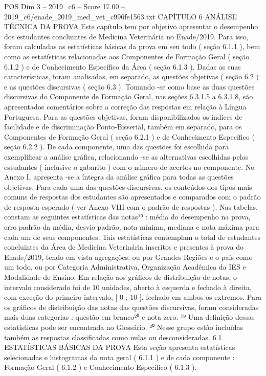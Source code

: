 \begin{textsample}{POS Dim 3 – 2019\_c6 – Score 17.00 – 2019\_c6/enade\_2019\_med\_vet\_c996fe1563.txt}  \label{ex:f3_pos_010}
CAPÍTULO 6 ANÁLISE TÉCNICA DA PROVA Este capítulo tem por objetivo apresentar o desempenho dos estudantes concluintes de Medicina Veterinária no Enade/2019.
Para isso, foram calculadas as estatísticas básicas da prova em seu todo ( seção 6.1.1 ), bem como as estatísticas relacionadas aos Componentes de Formação Geral ( seção 6.1.2 ) e de Conhecimento Específico da Área ( seção 6.1.3 ).
Dadas as suas características, foram analisadas, em separado, as questões objetivas ( seção 6.2 ) e as questões discursivas ( seção 6.3 ).
Tomando -se como base as duas questões discursivas do Componente de Formação Geral, nas seções 6.3.1.5 a 6.3.1.8, são apresentados comentários sobre a correção das respostas em relação à Língua Portuguesa.
Para as questões objetivas, foram disponibilizados os índices de facilidade e de discriminação Ponto-Bisserial, também em separado, para os Componentes de Formação Geral ( seção 6.2.1 ) e de Conhecimento Específico ( seção 6.2.2 ).
De cada componente, uma das questões foi escolhida para exemplificar a análise gráfica, relacionando -se as alternativas escolhidas pelos estudantes ( inclusive o gabarito ) com o número de acertos no componente.
No Anexo I, apresenta -se a íntegra da análise gráfica para todas as questões objetivas.
Para cada uma das questões discursivas, os conteúdos dos tipos mais comuns de respostas dos estudantes são apresentados e comparados com o padrão de resposta esperado ( ver Anexo VIII com o padrão de respostas ).
Nas tabelas, constam as seguintes estatísticas das notas¹⁹ : média do desempenho na prova, erro padrão da média, desvio padrão, nota mínima, mediana e nota máxima para cada um de seus componentes.
Tais estatísticas contemplam o total de estudantes concluintes da Área de Medicina Veterinária inscritos e presentes à prova do Enade/2019, tendo em vista agregações, ou por Grandes Regiões e o país como um todo, ou por Categoria Administrativa, Organização Acadêmica da IES e Modalidade de Ensino.
Em relação aos gráficos de distribuição de notas, o intervalo considerado foi de 10 unidades, aberto à esquerda e fechado à direita, com exceção do primeiro intervalo, [ 0 ; 10 ], fechado em ambos os extremos.
Para os gráficos de distribuição das notas das questões discursivas, foram consideradas mais duas categorias : questão em branco²⁰ e nota zero. ¹⁹ Uma definição dessas estatísticas pode ser encontrada no Glossário. ²⁰ Nesse grupo estão incluídas também as respostas classificadas como nulas ou desconsideradas. 6.1 ESTATÍSTICAS BÁSICAS DA PROVA Esta seção apresenta estatísticas selecionadas e histogramas da nota geral ( 6.1.1 ) e de cada componente : Formação Geral ( 6.1.2 ) e Conhecimento Específico ( 6.1.3 ).

\end{textsample}
